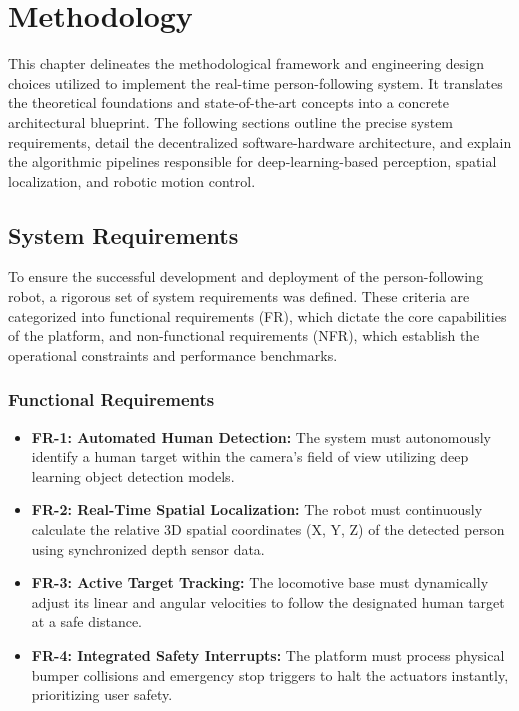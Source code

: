 \chapter{Methodology}
This chapter delineates the methodological framework and engineering design choices utilized to implement the real-time person-following system. It translates the theoretical foundations and state-of-the-art concepts into a concrete architectural blueprint. The following sections outline the precise system requirements, detail the decentralized software-hardware architecture, and explain the algorithmic pipelines responsible for deep-learning-based perception, spatial localization, and robotic motion control.

\section{System Requirements}
To ensure the successful development and deployment of the person-following robot, a rigorous set of system requirements was defined. These criteria are categorized into functional requirements (FR), which dictate the core capabilities of the platform, and non-functional requirements (NFR), which establish the operational constraints and performance benchmarks.

\subsection{Functional Requirements}
\begin{itemize}
	\item \textbf{FR-1: Automated Human Detection:} The system must autonomously identify a human target within the camera's field of view utilizing deep learning object detection models.
	\item \textbf{FR-2: Real-Time Spatial Localization:} The robot must continuously calculate the relative 3D spatial coordinates (X, Y, Z) of the detected person using synchronized depth sensor data.
	\item \textbf{FR-3: Active Target Tracking:} The locomotive base must dynamically adjust its linear and angular velocities to follow the designated human target at a safe distance.
	\item \textbf{FR-4: Integrated Safety Interrupts:} The platform must process physical bumper collisions and emergency stop triggers to halt the actuators instantly, prioritizing user safety.
\end{itemize}

